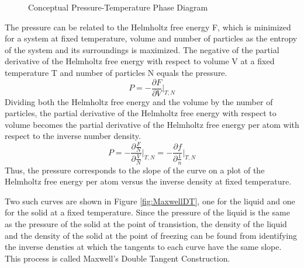 \documentclass[12pt]{article}
\begin{document}
\begin{figure}[h!]
    \centering
    \caption{Conceptual Pressure-Temperature Phase Diagram}
    \label{fig:P-T_Diagram}
  \end{figure}
The pressure can be related to the Helmholtz free energy F, which is minimized for a system at fixed temperature, volume and number of particles as the entropy of the system and its surroundings is maximized. The negative of the partial derivative of the Helmholtz free energy with respect to volume V at a fixed temperature T and number of particles N equals the pressure. 
\begin{equation}{P=-\frac{\partial{F}}{\partial{V}}\bigg|_{T,N}}\end{equation}
\noindent Dividing both the Helmholtz free energy and the volume by the number of particles, the partial derivative of the Helmholtz free energy with respect to volume becomes the partial derivative of the Helmholtz free energy per atom with respect to the inverse number density. \begin{equation}{P=-\frac{\partial{\frac{F}{N}}}{\partial{\frac{V}{N}}}\bigg|_{T,N} = -\frac{\partial{f}}{\partial{\frac{1}{n}}}\bigg|_{T,N}}\end{equation} Thus, the pressure corresponds to the slope of the curve on a plot of the Helmholtz free energy per atom versus the inverse density at fixed temperature. 

Two such curves are shown in Figure \ref{fig:MaxwellDT}, one for the liquid and one for the solid at a fixed temperature. Since the pressure of the liquid is the same as the pressure of the solid at the point of transistion, the density of the liquid and the density of the solid at the point of freezing can be found from identifying the inverse densties at which the tangents to each curve have the same slope. This process is called Maxwell's Double Tangent Construction. 
\end{document}
